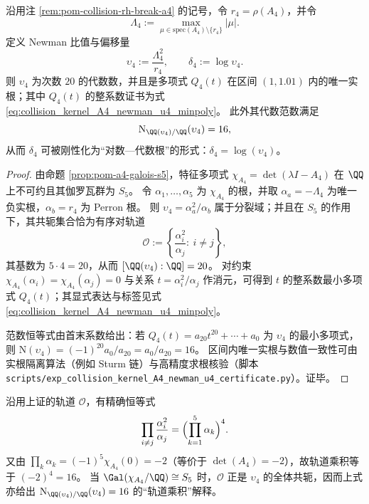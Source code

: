 \begin{proposition}\label{prop:pom-a4-newman-u4-algebraic-certificate}
沿用注 \ref{rem:pom-collision-rh-break-a4} 的记号，令 \(r_4=\rho(A_4)\)，并令
\[
\Lambda_4:=\max_{\mu\in\mathrm{spec}(A_4)\setminus\{r_4\}}|\mu|.
\]
定义 Newman 比值与偏移量
\[
\upsilon_4:=\frac{\Lambda_4^2}{r_4},\qquad \delta_4:=\log \upsilon_4.
\]
则 \(\upsilon_4\) 为次数 \(20\) 的代数数，并且是多项式 \(Q_4(t)\) 在区间 \((1,1.01)\) 内的唯一实根；其中 \(Q_4(t)\) 的整系数证书为式 \eqref{eq:collision_kernel_A4_newman_u4_minpoly}。
此外其代数范数满足
\[
\mathrm{N}_{\QQ(\upsilon_4)/\QQ}(\upsilon_4)=16,
\]
从而 \(\delta_4\) 可被刚性化为“对数—代数根”的形式：\(\delta_4=\log(\upsilon_4)\)。
\end{proposition}
\begin{proof}
由命题 \ref{prop:pom-a4-galois-s5}，特征多项式 \(\chi_{A_4}=\det(\lambda I-A_4)\) 在 \(\QQ\) 上不可约且其伽罗瓦群为 \(S_5\)。
令 \(\alpha_1,\dots,\alpha_5\) 为 \(\chi_{A_4}\) 的根，并取 \(\alpha_a=-\Lambda_4\) 为唯一负实根，\(\alpha_b=r_4\) 为 Perron 根。
则 \(\upsilon_4=\alpha_a^2/\alpha_b\) 属于分裂域；并且在 \(S_5\) 的作用下，其共轭集合恰为有序对轨道
\[
\mathcal{O}:=\left\{\frac{\alpha_i^2}{\alpha_j}:\ i\neq j\right\},
\]
其基数为 \(5\cdot 4=20\)，从而 \([\QQ(\upsilon_4):\QQ]=20\)。
对约束 \(\chi_{A_4}(\alpha_i)=\chi_{A_4}(\alpha_j)=0\) 与关系 \(t=\alpha_i^2/\alpha_j\) 作消元，可得到 \(t\) 的整系数最小多项式 \(Q_4(t)\)；其显式表达与标签见式 \eqref{eq:collision_kernel_A4_newman_u4_minpoly}。
\par
范数恒等式由首末系数给出：若 \(Q_4(t)=a_{20}t^{20}+\cdots+a_0\) 为 \(\upsilon_4\) 的最小多项式，则
\(
\mathrm{N}(\upsilon_4)=(-1)^{20}a_0/a_{20}=a_0/a_{20}=16
\)。
区间内唯一实根与数值一致性可由实根隔离算法（例如 Sturm 链）与高精度求根核验（脚本 \texttt{scripts/exp\_collision\_kernel\_A4\_newman\_u4\_certificate.py}）。证毕。
\end{proof}



\begin{remark}\label{rem:pom-a4-u4-orbit-product-norm}
沿用上证的轨道 \(\mathcal{O}\)，有精确恒等式
\[
\prod_{i\neq j}\frac{\alpha_i^2}{\alpha_j}
=\Bigl(\prod_{k=1}^5\alpha_k\Bigr)^{4}.
\]
又由 \(\prod_k\alpha_k=(-1)^5\chi_{A_4}(0)=-2\)（等价于 \(\det(A_4)=-2\)），故轨道乘积等于 \((-2)^4=16\)。
当 \(\Gal(\chi_{A_4}/\QQ)\cong S_5\) 时，\(\mathcal{O}\) 正是 \(\upsilon_4\) 的全体共轭，因而上式亦给出 \(\mathrm{N}_{\QQ(\upsilon_4)/\QQ}(\upsilon_4)=16\) 的“轨道乘积”解释。
\end{remark}

